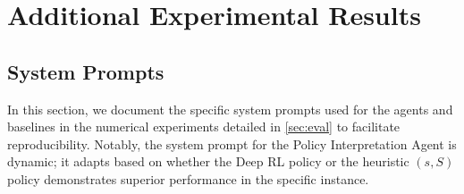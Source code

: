 \newpage

\section{Additional Experimental Results}

\subsection{System Prompts}\label{sec:system_prompts}

In this section, we document the specific system prompts used for the agents and baselines in the numerical experiments detailed in \cref{sec:eval} to facilitate reproducibility. Notably, the system prompt for the Policy Interpretation Agent is dynamic; it adapts based on whether the Deep RL policy or the heuristic $(s, S)$ policy demonstrates superior performance in the specific instance.

